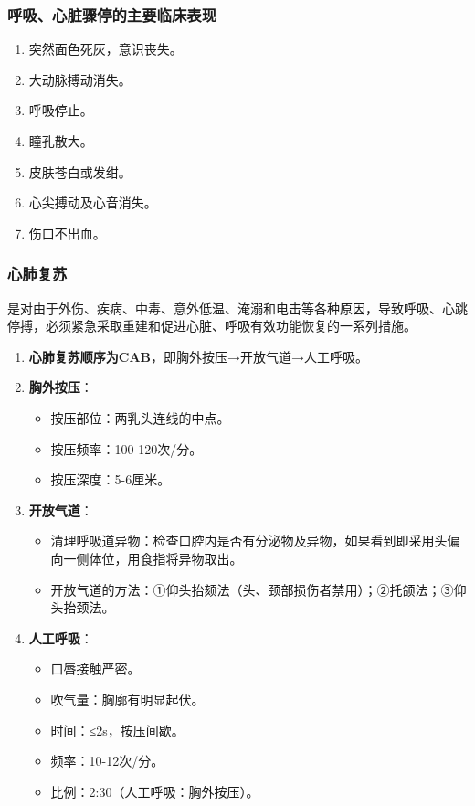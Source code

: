 \documentclass[11pt, a4paper]{ctexart}
\begin{document}
\subsubsection{呼吸、心脏骤停的主要临床表现}
\begin{enumerate}
    \item 突然面色死灰，意识丧失。
    \item 大动脉搏动消失。
    \item 呼吸停止。
    \item 瞳孔散大。
    \item 皮肤苍白或发绀。
    \item 心尖搏动及心音消失。
    \item 伤口不出血。
\end{enumerate}

\subsubsection{心肺复苏}
是对由于外伤、疾病、中毒、意外低温、淹溺和电击等各种原因，导致呼吸、心跳停搏，必须紧急采取重建和促进心脏、呼吸有效功能恢复的一系列措施。

\begin{enumerate}
    \item \textbf{心肺复苏顺序为CAB}，即胸外按压→开放气道→人工呼吸。
    \item \textbf{胸外按压}：
    \begin{itemize}
        \item 按压部位：两乳头连线的中点。
        \item 按压频率：100-120次/分。
        \item 按压深度：5-6厘米。
    \end{itemize}
    \item \textbf{开放气道}：
    \begin{itemize}
        \item 清理呼吸道异物：检查口腔内是否有分泌物及异物，如果看到即采用头偏向一侧体位，用食指将异物取出。
        \item 开放气道的方法：①仰头抬颏法（头、颈部损伤者禁用）；②托颌法；③仰头抬颈法。
    \end{itemize}
    \item \textbf{人工呼吸}：
    \begin{itemize}
        \item 口唇接触严密。
        \item 吹气量：胸廓有明显起伏。
        \item 时间：≤2s，按压间歇。
        \item 频率：10-12次/分。
        \item 比例：2:30（人工呼吸：胸外按压）。
    \end{itemize}
\end{enumerate}
\end{document}
